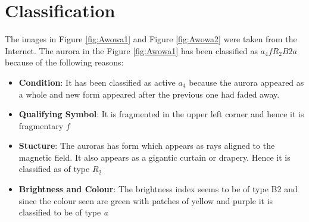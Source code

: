 \documentclass{article}
\begin{document}
 

\section{Classification}

The images in Figure \ref{fig:Awowa1} and Figure \ref{fig:Awowa2} were taken from the Internet. 
The aurora in the Figure \ref{fig:Awowa1} has been classified as $a_4fR_2B2a$ because of the following reasons:

\begin{itemize}
\item \textbf{Condition}:  It has been classified as active $ a_4 $ because the aurora appeared as a whole and new form appeared after the previous one had faded away.
\item \textbf{Qualifying Symbol}: It is fragmented in the upper left corner and hence it is fragmentary $ f $
\item \textbf{Stucture}: The auroras has form which appears as rays aligned to the magnetic field. It also appears as a gigantic curtain or drapery. Hence it is classified as of type $ R_2 $
\item \textbf{Brightness and Colour}: The brightness index seems to be of type B2 and since the colour seen are green with patches of yellow and purple it is classified to be of type \textit{a}
\end{itemize}
\end{document}
